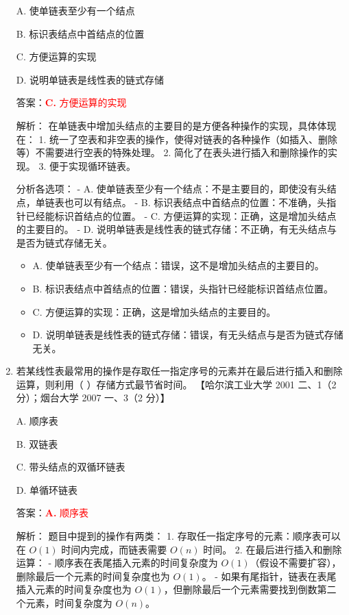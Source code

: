 \documentclass[lang=cn,newtx,10pt,scheme=chinese]{../../../elegantbook}
\begin{document}
\begin{enumerate}
        A. 使单链表至少有一个结点  
    
        B. 标识表结点中首结点的位置  
    
        C. 方便运算的实现  
    
        D. 说明单链表是线性表的链式存储  

        答案：\textcolor{red}{\textbf{C.} 方便运算的实现}

        解析：
        在单链表中增加头结点的主要目的是方便各种操作的实现，具体体现在：
        1. 统一了空表和非空表的操作，使得对链表的各种操作（如插入、删除等）不需要进行空表的特殊处理。
        2. 简化了在表头进行插入和删除操作的实现。
        3. 便于实现循环链表。

        分析各选项：
        - A. 使单链表至少有一个结点：不是主要目的，即使没有头结点，单链表也可以有结点。
        - B. 标识表结点中首结点的位置：不准确，头指针已经能标识首结点的位置。
        - C. 方便运算的实现：正确，这是增加头结点的主要目的。
        - D. 说明单链表是线性表的链式存储：不正确，有无头结点与是否为链式存储无关。

        \begin{itemize}
            \item A. 使单链表至少有一个结点：错误，这不是增加头结点的主要目的。
            \item B. 标识表结点中首结点的位置：错误，头指针已经能标识首结点位置。
            \item C. 方便运算的实现：正确，这是增加头结点的主要目的。
            \item D. 说明单链表是线性表的链式存储：错误，有无头结点与是否为链式存储无关。
        \end{itemize}
    
        \item 若某线性表最常用的操作是存取任一指定序号的元素并在最后进行插入和删除运算，则利用（ ）存储方式最节省时间。  
        【哈尔滨工业大学 2001 二、1（2 分）；烟台大学 2007 一、3（2 分）】  
    
        A. 顺序表  
    
        B. 双链表  
    
        C. 带头结点的双循环链表  
    
        D. 单循环链表  

        答案：\textcolor{red}{\textbf{A.} 顺序表}

        解析：
        题目中提到的操作有两类：
        1. 存取任一指定序号的元素：顺序表可以在 $O(1)$ 时间内完成，而链表需要 $O(n)$ 时间。
        2. 在最后进行插入和删除运算：
           - 顺序表在表尾插入元素的时间复杂度为 $O(1)$（假设不需要扩容），删除最后一个元素的时间复杂度也为 $O(1)$。
           - 如果有尾指针，链表在表尾插入元素的时间复杂度也为 $O(1)$，但删除最后一个元素需要找到倒数第二个元素，时间复杂度为 $O(n)$。


\end{enumerate}
\end{document}
